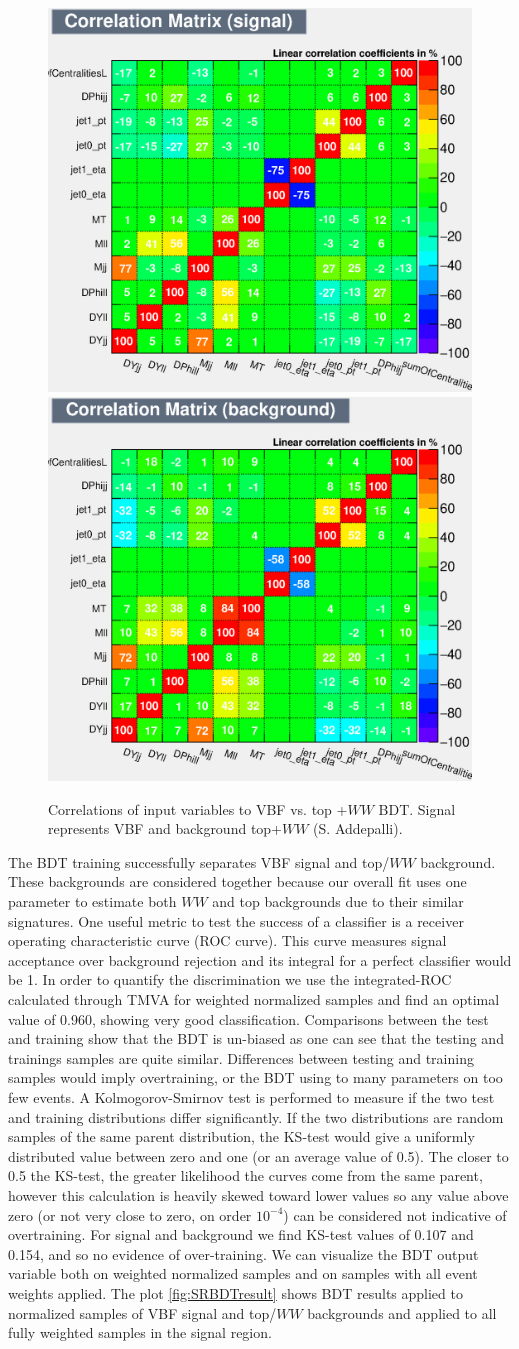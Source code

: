 \begin{figure}[!htbp]
  \centering
  \includegraphics[width=.4\linewidth]{Pictures/VBFvsWW+Top/CorrelationMatrixS.eps}
  \includegraphics[width=.4\linewidth]{Pictures/VBFvsWW+Top/CorrelationMatrixB.eps}
\caption{Correlations of input variables to VBF vs. top +$WW$ BDT. Signal represents VBF and background top+$WW$ (S. Addepalli).}
\label{fig:SRcorrSB}
\end{figure}
The BDT training successfully separates VBF signal and top/$WW$ background. These backgrounds are considered together because our overall fit uses one parameter to estimate both $WW$ and top backgrounds due to their similar signatures. One useful metric to test the success of a classifier is a receiver operating characteristic curve (ROC curve). This curve measures signal acceptance over background rejection and its integral for a perfect classifier would be 1. In order to quantify the discrimination we use the integrated-ROC calculated through TMVA for weighted normalized samples and find an optimal value of 0.960, showing very good classification. Comparisons between the test and training show that the BDT is un-biased as one can see that the testing and trainings samples are quite similar. Differences between testing and training samples would imply overtraining, or the BDT using to many parameters on too few events. A Kolmogorov-Smirnov test is performed to measure if the two test and training distributions differ significantly. If the two distributions are random samples of the same parent distribution, the KS-test would give a uniformly distributed value between zero and one (or an average value of 0.5). The closer to 0.5 the KS-test, the greater likelihood the curves come from the same parent, however this calculation is heavily skewed toward lower values so any value above zero (or not very close to zero, on order $10^{-4}$) can be considered not indicative of overtraining. For signal and background we find KS-test values of 0.107 and 0.154, and so no evidence of over-training. We can visualize the BDT output variable both on weighted normalized samples and on samples with all event weights applied. The plot \ref{fig:SRBDTresult} shows BDT results applied to normalized samples of VBF signal and top/$WW$ backgrounds and applied to all fully weighted samples in the signal region. 

